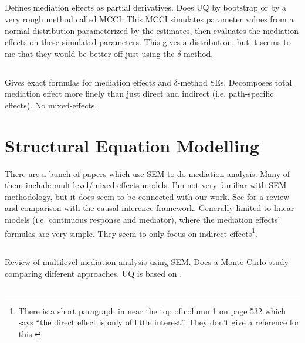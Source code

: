 \documentclass{article}
\begin{document}
\subsection{\citet{Gel18}}

Defines mediation effects as partial derivatives. Does UQ by bootstrap or by a very rough method called MCCI. This MCCI simulates parameter values from a normal distribution parameterized by the estimates, then evaluates the mediation effects on these simulated parameters. This gives a distribution, but it seems to me that they would be better off just using the $\delta$-method. 


\subsection{\citet{Dor22}}

Gives exact formulas for mediation effects and $\delta$-method SEs. Decomposes total mediation effect more finely than just direct and indirect (i.e. path-specific effects). No mixed-effects.

\section{Structural Equation Modelling}

There are a bunch of papers which use SEM to do mediation analysis. Many of them include multilevel/mixed-effects models. I'm not very familiar with SEM methodology, but it does seem to be connected with our work. See \citet{Val13} for a review and comparison with the causal-inference framework. Generally limited to linear models (i.e. continuous response and mediator), where the mediation effects' formulas are very simple. They seem to only focus on indirect effects\footnote{There is a short paragraph in \citet{Zit21} near the top of column 1 on page 532 which says ``the direct effect is only of little interest''. They don't give a reference for this.}.

\subsection{\citet{Zig19}}

Review of multilevel mediation analysis using SEM. Does a Monte Carlo study comparing different approaches. UQ is based on \citet{Bau06}.

\subsection{\citet{Bau06}}
\end{document}
